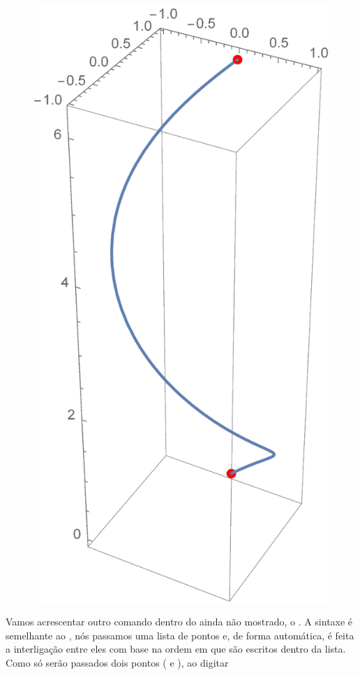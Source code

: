 \documentclass[a4paper, 12pt]{article}
\begin{document}
\begin{figure}[!h]
	\centering
	\includegraphics[scale=.24]{images/ShowParametricPlot}
\end{figure}


\newpage
Vamos acrescentar outro comando dentro do  ainda não mostrado, o . A sintaxe é semelhante ao , nós passamos uma lista de pontos e, de forma automática, é feita a interligação entre eles com base na ordem em que são escritos dentro da lista. Como só serão passados dois pontos ( e ), ao digitar
\end{document}

